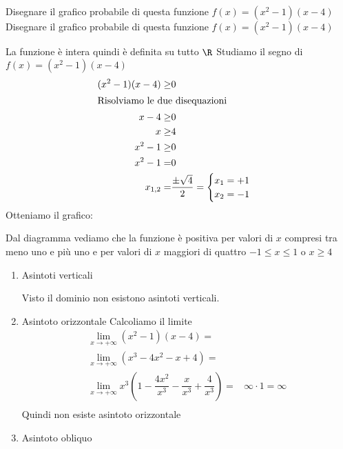 \begin{exercise}
	Disegnare il grafico probabile di questa funzione $f(x)=(x^2-1)(x-4)$
\tcblower
	Disegnare il grafico probabile di questa funzione $f(x)=(x^2-1)(x-4)$
	\begin{itemize}
	La funzione è intera quindi è definita su tutto $\R$
	Studiamo il segno di $f(x)=(x^2-1)(x-4)$
	\begin{align*}
(x^2-1)(x-4)\geq&0\\
\intertext{Risolviamo le due disequazioni}
x-4\geq&0\\
x\geq&4\\
x^2-1\geq&0\\
x^2-1=&0\\
x_{1,2}=&\dfrac{\pm\sqrt{4}}{2}
=\begin{cases}
x_1=+1\\
x_2=-1
\end{cases}\\
	\end{align*}
Otteniamo il grafico:
\begin{center}
	
\end{center}
Dal diagramma vediamo che la funzione è positiva per valori di $x$ compresi tra meno uno e più uno e per valori di $x$ maggiori di quattro $-1\leq x \leq 1$ o $x\geq 4$
	\begin{enumerate}
		\item Asintoti verticali
		
		Visto il dominio non esistono asintoti verticali.
		\item Asintoto orizzontale 
		Calcoliamo il limite
		\begin{align*}
		\lim_{x\to +\infty}(x^2-1)(x-4)=&\\
		\lim_{x\to +\infty}(x^3-4x^2-x+4)=&\\
		\lim_{x\to +\infty}x^3(1-\dfrac{4x^2}{x^3}-\dfrac{x}{x^3}+\dfrac{4}{x^3})=&\infty\cdot 1=\infty\\
		\end{align*}
		Quindi non esiste asintoto orizzontale
		\item Asintoto obliquo
		

\end{enumerate}
\end{itemize}
\end{exercise}
